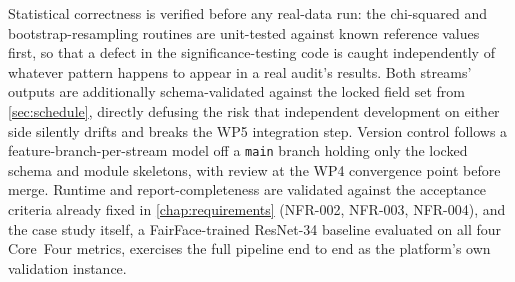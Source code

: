 Statistical correctness is verified before any real-data run: the chi-squared and bootstrap-resampling routines are unit-tested against known reference values first, so that a defect in the significance-testing code is caught independently of whatever pattern happens to appear in a real audit's results. Both streams' outputs are additionally schema-validated against the locked field set from \cref{sec:schedule}, directly defusing the risk that independent development on either side silently drifts and breaks the WP5 integration step. Version control follows a feature-branch-per-stream model off a \texttt{main} branch holding only the locked schema and module skeletons, with review at the WP4 convergence point before merge. Runtime and report-completeness are validated against the acceptance criteria already fixed in \cref{chap:requirements} (NFR-002, NFR-003, NFR-004), and the case study itself, a FairFace-trained ResNet-34 baseline evaluated on all four Core~Four metrics, exercises the full pipeline end to end as the platform's own validation instance.
